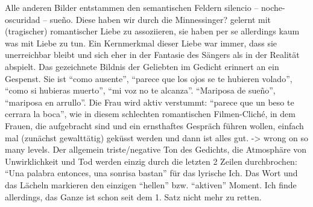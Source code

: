 
Alle anderen Bilder entstammen den semantischen Feldern silencio -- noche-oscuridad -- sueño.
Diese haben wir durch die Minnessinger? gelernt mit (tragischer) romantischer Liebe zu assoziieren, sie haben per se allerdings kaum was mit Liebe zu tun.
Ein Kernmerkmal dieser Liebe war immer, dass sie unerreichbar bleibt und sich eher in der Fantasie des Sängers als in der Realität abspielt. %
Das gezeichnete Bildnis der Geliebten im Gedicht erinnert an ein Gespenst.
Sie ist ``como ausente'', ``parece que los ojos se te hubieren volado'', ``como si hubieras muerto'', ``mi voz no te alcanza''.
``Mariposa de sueño'', ``mariposa en arrullo''.
Die Frau wird aktiv verstummt: ``parece que un beso te cerrara la boca'', wie in diesem schlechten romantischen Filmen-Cliché, in dem Frauen, die aufgebracht sind und ein ernsthaftes Gespräch führen wollen, einfach mal (zunächst gewalttätig) geküsst werden und dann ist alles gut. -> wrong on so many levels.
Der allgemein triste/negative Ton des Gedichts, die Atmosphäre von Unwirklichkeit und Tod werden einzig durch die letzten 2 Zeilen durchbrochen: ``Una palabra entonces, una sonrisa bastan'' für das lyrische Ich.
Das Wort und das Lächeln markieren den einzigen ``hellen'' bzw. ``aktiven'' Moment.
Ich finde allerdings, das Ganze ist schon seit dem 1. Satz nicht mehr zu retten.

